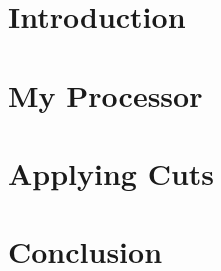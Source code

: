 \newif\iflinenumbers
\linenumberstrue  %









\clearpage


\tableofcontents
\clearpage


\section{Introduction}
\label{SEC:Introduction}



\section{My Processor}
\label{SEC:MyProcessor}



\section{Applying Cuts}
\label{SEC:ApplyingCuts}



\section{Conclusion}
\label{SEC:Conclusion}




\clearpage

